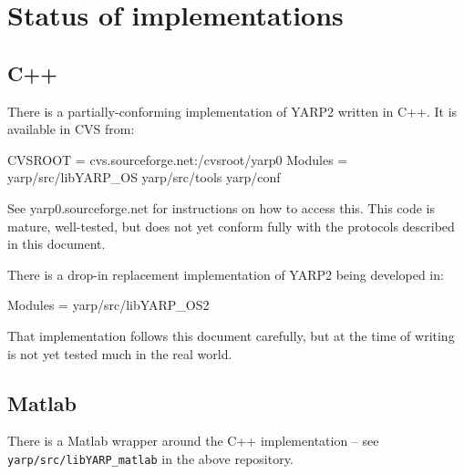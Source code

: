 \documentclass[a4]{article}
\newenvironment{codecase}[1]{\subsection{#1}}{}
\begin{document}







\section{Status of implementations}


\subsection{C++}

There is a partially-conforming implementation of YARP2 written
in C++.  It is available in CVS from:
\begin{code}
  CVSROOT = cvs.sourceforge.net:/cvsroot/yarp0
  Modules = yarp/src/libYARP_OS yarp/src/tools yarp/conf
\end{code}
See yarp0.sourceforge.net for instructions on how to access this.
This code is mature, well-tested, but does not yet conform fully
with the protocols described in this document.

There is a drop-in replacement implementation of YARP2 being developed
in:

\begin{code}
  Modules = yarp/src/libYARP_OS2
\end{code}

\indent
That implementation follows this document carefully, but at the
time of writing is not yet tested much in the real world.

\subsection{Matlab}

There is a Matlab wrapper around the C++ implementation --
see {\tt yarp/src/libYARP\_matlab} in the above repository.
\end{document}
